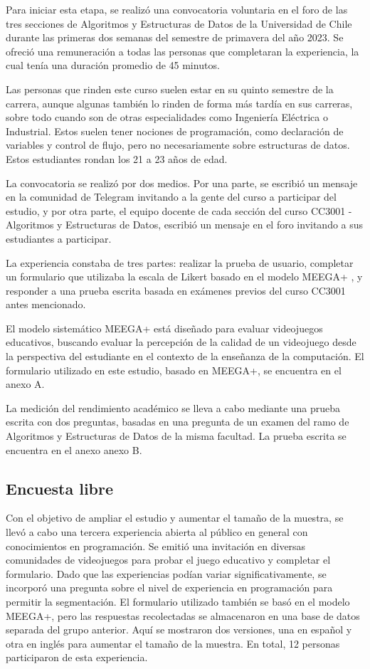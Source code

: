 Para iniciar esta etapa, se realizó una convocatoria voluntaria en el foro de las tres secciones de Algoritmos y Estructuras de Datos de la Universidad de Chile durante las primeras dos semanas del semestre de primavera del año 2023. Se ofreció una remuneración a todas las personas que completaran la experiencia, la cual tenía una duración promedio de 45 minutos. 

Las personas que rinden este curso suelen estar en su quinto semestre de la carrera, aunque algunas también lo rinden de forma más tardía en sus carreras, sobre todo cuando son de otras especialidades como Ingeniería Eléctrica o Industrial. Estos suelen tener nociones de programación, como declaración de variables y control de flujo, pero no necesariamente sobre estructuras de datos. Estos estudiantes rondan los 21 a 23  años de edad.

La convocatoria se realizó por dos medios. Por una parte, se escribió un mensaje en la comunidad de Telegram invitando a la gente del curso a participar del estudio, y por otra parte, el equipo docente de cada sección del curso CC3001 - Algoritmos y Estructuras de Datos, escribió un mensaje en el foro invitando a sus estudiantes a participar.


La experiencia constaba de tres partes: realizar la prueba de usuario, completar un formulario que utilizaba la escala de Likert basado en el modelo MEEGA+ \cite{meegaplus}, y responder a una prueba escrita basada en exámenes previos del curso CC3001 antes mencionado.

El modelo sistemático MEEGA+ \cite{meegaplus} está diseñado para evaluar videojuegos educativos, buscando evaluar la percepción de la calidad de un videojuego desde la perspectiva del estudiante en el contexto de la enseñanza de la computación. El formulario utilizado en este estudio, basado en MEEGA+, se encuentra en el anexo A.

La medición del rendimiento académico se lleva a cabo mediante una prueba escrita con dos preguntas, basadas en una pregunta de un examen del ramo de Algoritmos y Estructuras de Datos de la misma facultad. La prueba escrita se encuentra en el anexo anexo B.


\subsection{Encuesta libre}


Con el objetivo de ampliar el estudio y aumentar el tamaño de la muestra, se llevó a cabo una tercera experiencia abierta al público en general con conocimientos en programación. Se emitió una invitación en diversas comunidades de videojuegos para probar el juego educativo y completar el formulario. Dado que las experiencias podían variar significativamente, se incorporó una pregunta sobre el nivel de experiencia en programación para permitir la segmentación. El formulario utilizado también se basó en el modelo MEEGA+, pero las respuestas recolectadas se almacenaron en una base de datos separada del grupo anterior. Aquí se mostraron dos versiones, una en español y otra en inglés para aumentar el tamaño de la muestra. En total, 12 personas participaron de esta experiencia.
